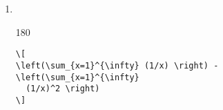 \begin{enumerate}

\item ~\\
  \begin{turn}{180}
    \begin{minipage}{\linewidth}
      \begin{framed}
\begin{verbatim}
\[
\left(\sum_{x=1}^{\infty} (1/x) \right) -
\left(\sum_{x=1}^{\infty}
  (1/x)^2 \right)
\]
\end{verbatim}
      \end{framed}
    \end{minipage}
  \end{turn}


\end{enumerate}


